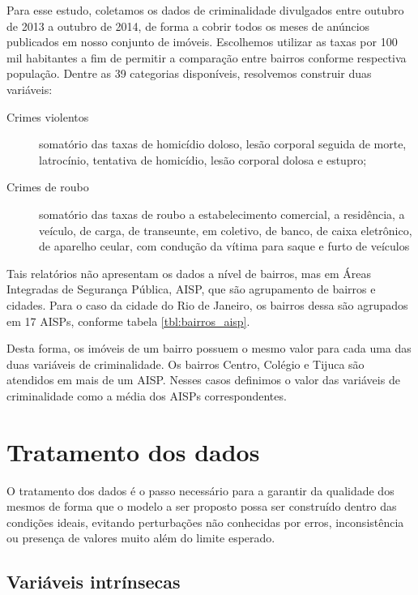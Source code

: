 Para esse estudo, coletamos os dados de criminalidade divulgados entre outubro de 2013 a outubro de 2014, de forma a cobrir todos os meses de anúncios publicados em nosso conjunto de imóveis. Escolhemos utilizar as taxas por 100 mil habitantes a fim de permitir a comparação entre bairros conforme respectiva população. Dentre as 39 categorias disponíveis, resolvemos construir duas variáveis:

\begin{description}
	\item [Crimes violentos] somatório das taxas de homicídio doloso, lesão corporal seguida de morte, latrocínio, tentativa de homicídio, lesão corporal dolosa e estupro;
	\item [Crimes de roubo] somatório das taxas de roubo a estabelecimento comercial,  a residência, a veículo, de carga, de transeunte, em coletivo, de banco, de caixa eletrônico, de aparelho ceular, com condução da vítima para saque e furto de veículos
\end{description}

Tais relatórios não apresentam os dados a nível de bairros, mas em Áreas Integradas de Segurança Pública, AISP, que são agrupamento de bairros e cidades. Para o caso da cidade do Rio de Janeiro, os bairros dessa são agrupados em 17 AISPs, conforme tabela \ref{tbl:bairros_aisp}. 




Desta forma, os imóveis de um bairro possuem o mesmo valor para cada uma das duas variáveis de criminalidade. Os bairros Centro, Colégio  e Tijuca são atendidos em mais de um AISP. Nesses casos definimos o valor das variáveis de criminalidade como a média dos AISPs correspondentes.

\section{Tratamento dos dados}

O tratamento dos dados é o passo necessário para a garantir da qualidade dos mesmos de forma que o modelo a ser proposto possa ser construído dentro das condições ideais, evitando perturbações não conhecidas por erros, inconsistência ou presença de valores muito além do limite esperado.

\subsection{Variáveis intrínsecas}


